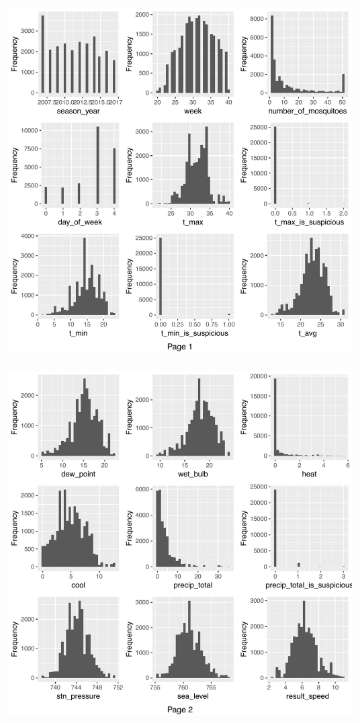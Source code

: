 \begin{figure}[H]
	\centering
	\begin{subfigure}[t]{0.49\textwidth}
		\includegraphics[width=\textwidth]{images/ml/plot_histogram1}
	\end{subfigure}
	\begin{subfigure}[t]{0.49\textwidth}
		\includegraphics[width=\textwidth]{images/ml/plot_histogram2}
	\end{subfigure}
\end{figure}

